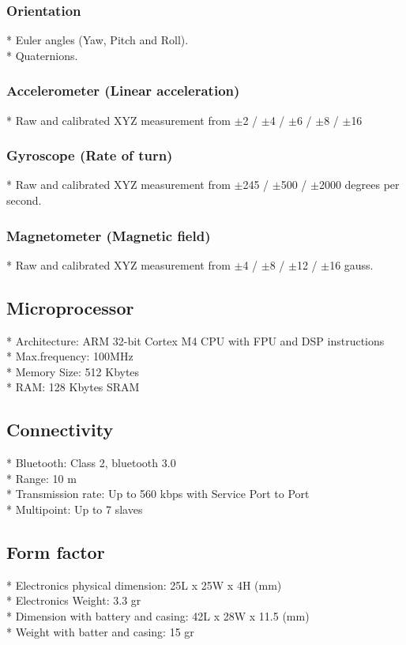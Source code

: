 \subsubsection*{Orientation}
* Euler angles (Yaw, Pitch and Roll). \\
* Quaternions.

\subsubsection*{Accelerometer (Linear acceleration)}
* Raw and calibrated XYZ measurement from 
$\pm$2 / $\pm$4 / $\pm$6 / $\pm$8  / $\pm$16

\subsubsection*{Gyroscope (Rate of turn)}
* Raw and calibrated XYZ measurement from 
$\pm$245 /  $\pm$500 / $\pm$2000 degrees per second.

\subsubsection*{Magnetometer (Magnetic field)}
* Raw and calibrated XYZ measurement from 
$\pm$4 / $\pm$8 / $\pm$12 / $\pm$16 gauss.


\subsection*{Microprocessor}
* Architecture: ARM 32-bit Cortex M4 CPU with FPU and DSP instructions \\
* Max.frequency: 100MHz \\
* Memory Size: 512 Kbytes \\
* RAM: 128 Kbytes SRAM


\subsection*{Connectivity}
* Bluetooth: Class 2, bluetooth 3.0 \\
* Range: 10 m \\
* Transmission rate: Up to 560 kbps with Service Port to Port \\
* Multipoint: Up to 7 slaves


\subsection*{Form factor}
* Electronics physical dimension: 25L x 25W x 4H (mm) \\
* Electronics Weight: 3.3 gr \\
* Dimension with battery and casing: 42L x 28W x 11.5 (mm) \\
* Weight with batter and casing: 15 gr


